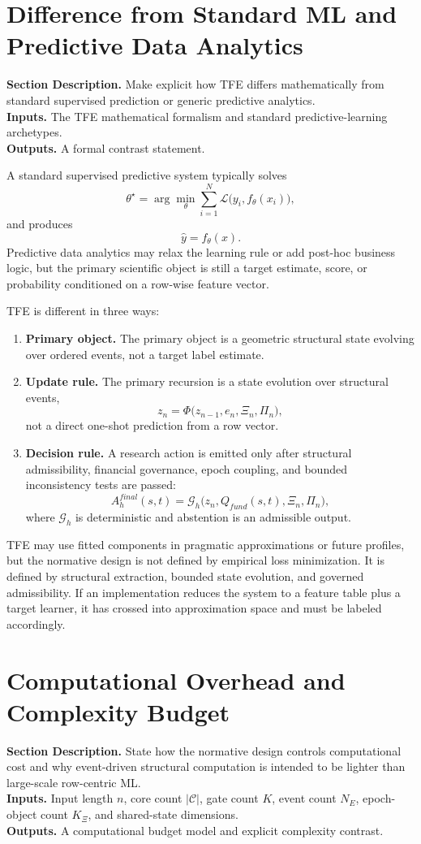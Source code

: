 \documentclass[11pt]{report}
\newcommand{\meta}[3]{\textbf{Section Description.} #1\\
\textbf{Inputs.} #2\\
\textbf{Outputs.} #3\par}
\begin{document}
\section{Difference from Standard ML and Predictive Data Analytics}
\meta{Make explicit how TFE differs mathematically from standard supervised prediction or generic predictive analytics.}{The TFE mathematical formalism and standard predictive-learning archetypes.}{A formal contrast statement.}

A standard supervised predictive system typically solves
\[
\theta^{\star}=\arg\min_{\theta}\sum_{i=1}^{N}\mathcal{L}\big(y_i, f_{\theta}(x_i)\big),
\]
and produces
\[
\hat y = f_{\theta}(x).
\]
Predictive data analytics may relax the learning rule or add post-hoc business logic, but the primary scientific object is still a target estimate, score, or probability conditioned on a row-wise feature vector.

TFE is different in three ways:
\begin{enumerate}[leftmargin=1.2cm]
    \item \textbf{Primary object.} The primary object is a geometric structural state evolving over ordered events, not a target label estimate.
    \item \textbf{Update rule.} The primary recursion is a state evolution over structural events,
    \[
    z_n = \Phi\big(z_{n-1}, e_n, \Xi_n, \Pi_n\big),
    \]
    not a direct one-shot prediction from a row vector.
    \item \textbf{Decision rule.} A research action is emitted only after structural admissibility, financial governance, epoch coupling, and bounded inconsistency tests are passed:
    \[
    A_h^{final}(s,t)=\mathcal{G}_h\big(z_n,Q_{fund}(s,t),\Xi_n,\Pi_n\big),
    \]
    where $\mathcal{G}_h$ is deterministic and abstention is an admissible output.
\end{enumerate}

TFE may use fitted components in pragmatic approximations or future profiles, but the normative design is not defined by empirical loss minimization. It is defined by structural extraction, bounded state evolution, and governed admissibility. If an implementation reduces the system to a feature table plus a target learner, it has crossed into approximation space and must be labeled accordingly.

\section{Computational Overhead and Complexity Budget}
\meta{State how the normative design controls computational cost and why event-driven structural computation is intended to be lighter than large-scale row-centric ML.}{Input length $n$, core count $|\mathcal{C}|$, gate count $K$, event count $N_E$, epoch-object count $K_{\Xi}$, and shared-state dimensions.}{A computational budget model and explicit complexity contrast.}
\end{document}
